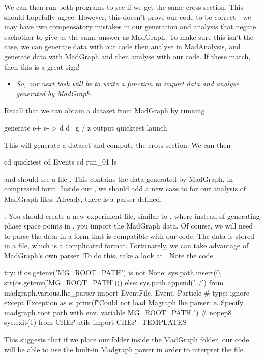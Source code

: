We can then run both programs to see if we get the same cross-section. This should hopefully agree. However, this doesn't prove our code to be correct - we may have two compensatory mistakes in our generation and analysis that negate eachother to give us the same answer as MadGraph. To make sure this isn't the case, we can generate data with our code then analyse in MadAnalysis, and generate data with MadGraph and then analyse with our code. If these match, then this is a great sign!

\begin{itemize}
    \item \textit{So, our next task will be to write a function to import data and analyse generated by MadGraph.}
\end{itemize}

Recall that we can obtain a dataset from MadGraph by running
\begin{codeenv}
    generate e+ e- > d d~ g / z
    output quicktest
    launch
\end{codeenv}
This will generate a dataset and compute the cross section. We can then
\begin{codeenv}
    cd quicktest
    cd Events
    cd run_01
    ls
\end{codeenv}
and should see a file . This contains the data generated by MadGraph, in compressed form. Inside our , we should add a new case to  for our analysis of MadGraph files. Already, there is a parser defined, 

. You should create a new experiment file, similar to , where instead of generating phase space points in , you import the MadGraph data. Of course, we will need to parse the data in a form that is compatible with our code. The data is stored in a  file, which is a complicated format. Fortunately, we can take advantage of MadGraph's own parser. To do this, take a look at .
Note the code 
\begin{codeenv}
    try:
    if os.getenv('MG_ROOT_PATH') is not None:
        sys.path.insert(0, str(os.getenv('MG_ROOT_PATH')))
    else:
        sys.path.append('../')
    from madgraph.various.lhe_parser import EventFile, Event, Particle  # type: ignore
except Exception as e:
    print(f"Could not load Magraph lhe parser: {e}. Specify madgraph root path 
    with env. variable MG_ROOT_PATH.")  # nopep8
    sys.exit(1)
from CHEP.utils import CHEP_TEMPLATES
\end{codeenv}
This suggests that if we place our  folder inside the MadGraph folder, our code will be able to use the built-in Madgraph parser in order to interpret the file.

